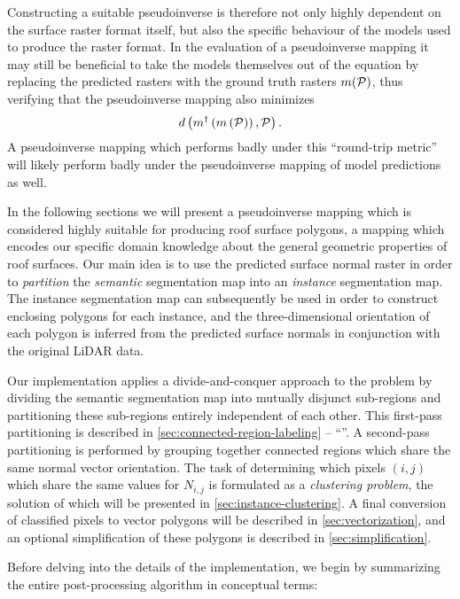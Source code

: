 Constructing a suitable pseudoinverse is therefore not only highly dependent on the surface raster format itself, but also the specific behaviour of the models used to produce the raster format.
In the evaluation of a pseudoinverse mapping it may still be beneficial to take the models themselves out of the equation by replacing the predicted rasters with the ground truth rasters $m(\mathcal{P})$, thus verifying that the pseudoinverse mapping also minimizes
\begin{equation*}
  d\left(
    m^{\dagger}\left(m\left(\mathcal{P}\right)\right),
    \mathcal{P}
  \right).
\end{equation*}
A pseudoinverse mapping which performs badly under this \enquote{round-trip metric} will likely perform badly under the pseudoinverse mapping of model predictions as well.
\newpage

In the following sections we will present a pseudoinverse mapping which is considered highly suitable for producing roof surface polygons, a mapping which encodes our specific domain knowledge about the general geometric properties of roof surfaces.
Our main idea is to use the predicted surface normal raster in order to \textit{partition} the \textit{semantic} segmentation map into an \textit{instance} segmentation map.
The instance segmentation map can subsequently be used in order to construct enclosing polygons for each instance, and the three-dimensional orientation of each polygon is inferred from the predicted surface normals in conjunction with the original LiDAR data.

Our implementation applies a divide-and-conquer approach to the problem by dividing the semantic segmentation map into mutually disjunct sub-regions and partitioning these sub-regions entirely independent of each other.
This first-pass partitioning is described in \cref{sec:connected-region-labeling} -- \enquote{}.
A second-pass partitioning is performed by grouping together connected regions which share the same normal vector orientation.
The task of determining which pixels $(i, j)$ which share the same values for $N_{i, j}$ is formulated as a \textit{clustering problem}, the solution of which will be presented in \cref{sec:instance-clustering}.
A final conversion of classified pixels to vector polygons will be described in \cref{sec:vectorization}, and an optional simplification of these polygons is described in \cref{sec:simplification}.

Before delving into the details of the implementation, we begin by summarizing the entire post-processing algorithm in conceptual terms:

